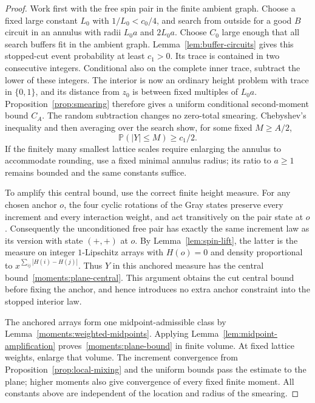 \documentclass[11pt]{article}
\theoremstyle{definition}
\theoremstyle{remark}
\numberwithin{equation}{section}
\begin{document}
\begin{proof}
Work first with the free spin pair in the finite ambient graph.
Choose a fixed large constant $L_0$ with $1/L_0<c_0/4$, and search
from outside for a good $B$ circuit in an annulus with radii
$L_0a$ and $2L_0a$.  Choose $C_0$ large enough that all search buffers
fit in the ambient graph.  Lemma~\ref{lem:buffer-circuits} gives this
stopped-cut event probability at least $c_1>0$.  Its trace is contained
in two consecutive integers.  Conditional also on the complete inner
trace, subtract the lower of these integers.  The interior is now an
ordinary height problem with trace in $\{0,1\}$, and its distance from
$z_0$ is between fixed multiples of $L_0a$.  Proposition~\ref{prop:smearing}
therefore gives a uniform conditional second-moment bound $C_A$.
The random subtraction changes no zero-total smearing.  Chebyshev's
inequality and then averaging over the search show, for some fixed
$M\geq A/2$,
\begin{equation}\label{moments:plane-central}
 \mathbb P(|Y|\leq M)\geq c_1/2.
\end{equation}
If the finitely many smallest lattice scales require enlarging the
annulus to accommodate rounding, use a fixed minimal annulus radius;
its ratio to $a\geq1$ remains bounded and the same constants suffice.

To amplify this central bound, use the correct finite height measure.
For any chosen anchor $o$, the four cyclic rotations of the Gray states
preserve every increment and every interaction weight, and act
transitively on the pair state at $o$.  Consequently the unconditioned
free pair has exactly the same increment law as its version with state
$(+,+)$ at $o$.  By Lemma~\ref{lem:spin-lift}, the latter is the measure
on integer $1$-Lipschitz arrays with $H(o)=0$ and density proportional
to $x^{\sum_{ij}|H(i)-H(j)|}$.  Thus $Y$ in this anchored measure has
the central bound~\eqref{moments:plane-central}.  This argument obtains
the cut central bound before fixing the anchor, and hence introduces
no extra anchor constraint into the stopped interior law.

The anchored arrays form one midpoint-admissible class by
Lemma~\ref{moments:weighted-midpoints}.  Applying
Lemma~\ref{lem:midpoint-amplification} proves~\eqref{moments:plane-bound}
in finite volume.  At fixed lattice weights, enlarge that volume.
The increment convergence from Proposition~\ref{prop:local-mixing}
and the uniform bounds pass the estimate to the plane; higher moments
also give convergence of every fixed finite moment.  All constants
above are independent of the location and radius of the smearing.
\end{proof}
\end{document}
